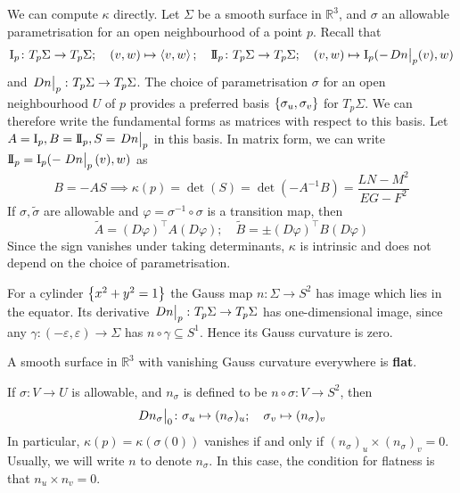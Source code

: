 \documentclass[a4paper]{article}
\begin{document}
We can compute \( \kappa \) directly.
Let \( \Sigma \) be a smooth surface in \( \mathbb R^3 \), and \( \sigma \) an allowable parametrisation for an open neighbourhood of a point \( p \).
Recall that
\[
	\Iff_p \colon T_p \Sigma \to T_p \Sigma;\quad (v,w) \mapsto \inner{v,w};\quad \IIff_p \colon T_p \Sigma \to T_p \Sigma;\quad (v,w) \mapsto \Iff_p(-\teval{Dn}p(v), w)
\]
and \( \eval{Dn}_p \colon T_p \Sigma \to T_p \Sigma \).
The choice of parametrisation \( \sigma \) for an open neighbourhood \( U \) of \( p \) provides a preferred basis \( \qty{\sigma_u, \sigma_v} \) for \( T_p \Sigma \).
We can therefore write the fundamental forms as matrices with respect to this basis.
Let \( A = \Iff_p, B = \IIff_p, S = \eval{Dn}_p \) in this basis.
In matrix form, we can write \( \IIff_p = \Iff_p(-\eval{Dn}_p(v),w) \) as
\[
	B = -AS \implies \kappa(p) = \det(S) = \det(-A^{-1}B) = \frac{LN-M^2}{EG-F^2}
\]
If \( \sigma, \widetilde \sigma \) are allowable and \( \varphi = \sigma^{-1} \circ \sigma \) is a transition map, then
\[
	\widetilde A = (D\varphi)^\top A (D \varphi);\quad \widetilde B = \pm (D\varphi)^\top B (D \varphi)
\]
Since the sign vanishes under taking determinants, \( \kappa \) is intrinsic and does not depend on the choice of parametrisation.

\begin{example}
	For a cylinder \( \qty{x^2 + y^2 = 1} \) the Gauss map \( n \colon \Sigma \to S^2 \) has image which lies in the equator.
	Its derivative \( \eval{Dn}_p \colon T_p \Sigma \to T_p \Sigma \) has one-dimensional image, since any \( \gamma \colon (-\varepsilon, \varepsilon) \to \Sigma \) has \( n \circ \gamma \subseteq S^1 \).
	Hence its Gauss curvature is zero.
\end{example}

\begin{definition}
	A smooth surface in \( \mathbb R^3 \) with vanishing Gauss curvature everywhere is \textbf{flat}.
\end{definition}

\begin{remark}
	If \( \sigma\colon V \to U \) is allowable, and \( n_\sigma \) is defined to be \( n \circ \sigma \colon V \to S^2 \), then
	\[
		\teval{Dn_\sigma}0 \colon \sigma_u \mapsto (n_\sigma)_u;\quad \sigma_v \mapsto (n_\sigma)_v
	\]
	In particular, \( \kappa(p) = \kappa(\sigma(0)) \) vanishes if and only if \( (n_\sigma)_u \times (n_\sigma)_v = 0 \).
	Usually, we will write \( n \) to denote \( n_\sigma \).
	In this case, the condition for flatness is that \( n_u \times n_v = 0 \).
\end{remark}
\end{document}
